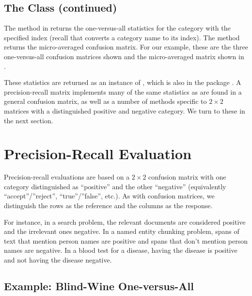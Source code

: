 \subsection{The  Class (continued)}

The method  in  returns the
one-versus-all statistics for the category with the specified index
(recall that  converts a category name to its
index).  The method  returns the micro-averaged
confusion matrix.  For our example, these are the three one-versus-all
confusion matrices shown  and the
micro-averaged matrix shown in . 


These statistics are returned as an instance of
, which is also in the package
.  A precision-recall matrix implements many
of the same statistics as are found in a general confusion matrix, as
well as a number of methods specific to $2 \times 2$ matrices with a
distinguished positive and negative category.  We turn to these in the
next section.
  

\section{Precision-Recall Evaluation}

Precision-recall evaluations are based on a $2 \times 2$ confusion
matrix with one category distinguished as ``positive'' and the other
``negative'' (equivalently ``accept''/''reject'', ``true''/''false'',
etc.).  As with confusion matrices, we distinguish the rows as the
reference and the columns as the response.  

For instance, in a search problem, the relevant documents are
considered positive and the irrelevant ones negative.  In a named
entity chunking problem, spans of text that mention person names are
positive and spans that don't mention person names are negative.  In a
blood test for a disease, having the disease is positive and not
having the disease negative.

\subsection{Example:  Blind-Wine One-versus-All}

